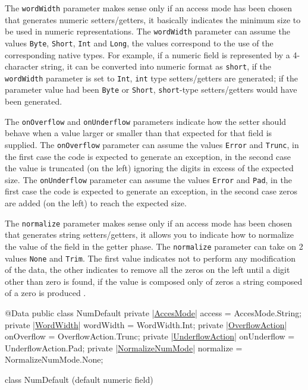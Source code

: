 \documentclass[a4paper,10pt]{report}
\newenvironment{elisting}[1][H]
  {\captionsetup{aboveskip=0pt}\begin{listing}[#1]}
  {\end{listing}%
}
\begin{document}
The \verb!wordWidth! parameter makes sense only if an access mode has been 
chosen that generates numeric setters/getters, it basically indicates the 
minimum size to be used in numeric representations. 
The \verb!wordWidth! parameter can assume the values \verb!Byte!, \verb!Short!, 
\verb!Int! and \verb!Long!, the values correspond to the use of the 
corresponding native types. 
For example, if a numeric field is represented by a 4-character string, it can 
be converted into numeric format as \verb!short!, if the \verb!wordWidth! 
parameter is set to \verb!Int!, \verb!int! type setters/getters are generated; 
if the parameter value had been \verb!Byte! or \verb!Short!, \verb!short!-type 
setters/getters would have been generated.

The \verb!onOverflow! and \verb!onUnderflow! parameters indicate how the setter 
should behave when a value larger or smaller than that expected for that field 
is supplied. 
The \verb!onOverflow! parameter can assume the values \verb!Error! and 
\verb!Trunc!, in the first case the code is expected to generate an exception, 
in the second case the value is truncated (on the left) ignoring the digits in 
excess of the expected size. 
The \verb!onUnderflow! parameter can assume the values \verb!Error! and 
\verb!Pad!, in the first case the code is expected to generate an exception, in 
the second case zeros are added (on the left) to reach the expected size.

The \verb!normalize! parameter makes sense only if an access mode has been 
chosen that generates string setters/getters, it allows you to indicate how to 
normalize the value of the field in the getter phase. 
The \verb!normalize! parameter can take on 2 values \verb!None! and \verb!Trim!. 
The first value indicates not to perform any modification of the data, the 
other indicates to remove all the zeros on the left until a digit other than 
zero is found, if the value is composed only of zeros a string composed of a 
zero is produced .

\begin{elisting}[!htb]
\begin{javacode}
@Data
public class NumDefault {
    private |\hyperref[lst:AccesMode]{AccesMode}| access = AccesMode.String;
    private |\hyperref[lst:WordWidth]{WordWidth}| wordWidth = WordWidth.Int;
    private |\hyperref[lst:OverflowAction]{OverflowAction}| onOverflow = OverflowAction.Trunc;
    private |\hyperref[lst:UnderflowAction]{UnderflowAction}| onUnderflow = UnderflowAction.Pad;
    private |\hyperref[lst:NormalizeNumMode]{NormalizeNumMode}| normalize = NormalizeNumMode.None;
}
\end{javacode}
\caption{class NumDefault (default numeric field)}
\label{lst:NumDefault}
\end{elisting}
\end{document}
